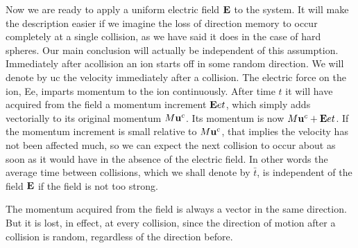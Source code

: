 Now we are ready to apply a uniform electric field $\mathbf{E}$ to the system.
It will make the description easier if we imagine the loss of direction
memory to occur completely at a single collision, as we have said it
does in the case of hard spheres. Our main conclusion will actually
be independent of this assumption. Immediately after acollision
an ion starts off in some random direction. We will denote by uc
the velocity immediately after a collision. The electric force on the
ion, Ee, imparts momentum to the ion continuously. After time $t$
it will have acquired from the field a momentum increment $\mathbf{E}et$,
which simply adds vectorially to its original momentum $M\mathbf{u}^c$. Its
momentum is now $M\mathbf{u}^c+\mathbf{E}et$. If the momentum increment is small
relative to $M\mathbf{u}^c$, that implies the velocity has not been affected much,
so we can expect the next collision to occur about as soon as it would
have in the absence of the electric field. In other words the average
time between collisions, which we shall denote by $\bar{t}$, is independent
of the field $\mathbf{E}$ if the field is not too strong.

The momentum acquired from the field is always a vector in the
same direction. But it is lost, in effect, at every collision, since the
direction of motion after a collision is random, regardless of the
direction before.

